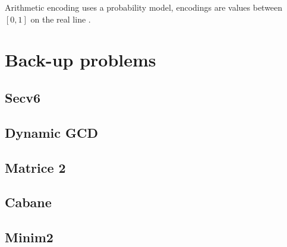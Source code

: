 \documentclass{llncs}
\begin{document}
Arithmetic encoding uses a probability model, encodings are values between $[0, 1]$ on the real line \cite{website:ArithmeticEncoding}.

%
%
%

\section{Back-up problems}

\subsection{Secv6 \cite{website:infoarena/secv6}}
\subsection{Dynamic GCD \cite{website:timus/gcd}}
\subsection{Matrice 2 \cite{website:infoarena/matrice2}}
\subsection{Cabane \cite{website:infoarena/cabane}}
\subsection{Minim2 \cite{website:infoarena/minim2}}


\clearpage


\end{document}
